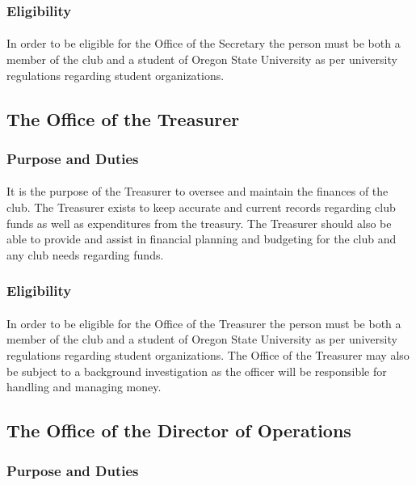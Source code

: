 \documentclass[12pt]{article}
\begin{document}
\subsubsection{Eligibility}
\paragraph{}
In order to be eligible for the Office of the Secretary the person must be both a member of the club and a student of Oregon State University as per university regulations regarding student organizations.

\subsection{The Office of the Treasurer}
\subsubsection{Purpose and Duties}
\paragraph{}
It is the purpose of the Treasurer to oversee and maintain the finances of the club. The Treasurer exists to keep accurate and current records regarding club funds as well as expenditures from the treasury.
The Treasurer should also be able to provide and assist in financial planning and budgeting for the club and any club needs regarding funds.
\subsubsection{Eligibility}
\paragraph{}
In order to be eligible for the Office of the Treasurer the person must be both a member of the club and a student of Oregon State University as per university regulations regarding student organizations.
The Office of the Treasurer may also be subject to a background investigation as the officer will be responsible for handling and managing money.

\subsection{The Office of the Director of Operations}
\subsubsection{Purpose and Duties}
\end{document}
